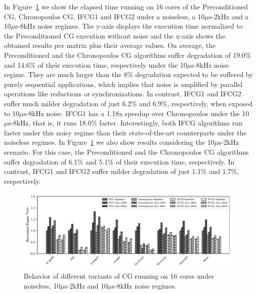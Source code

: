 In Figure~\ref{resiliency} we show the elapsed time running on 16 cores of the Preconditioned CG, Chronopoulos CG, IFCG1 and IFCG2 under a noiseless, a 10$\mu$s-2kHz and a 10$\mu$s-8kHz noise regimes. 
The y-axis displays the execution time normalized to the Preconditioned CG execution without noise and the x-axis shows the obtained results per matrix plus their average values. 
On average, the Preconditioned and the Chronopoulos CG algorithms suffer degradation of 19.0\% and 14.6\% of their execution time, respectively under the 10$\mu$s-8kHz noise regime. 
They are much larger than the 8\% degradation expected to be suffered by purely sequential applications, which implies that noise is amplified by parallel operations like reductions or synchronizations.
In contrast, IFCG1 and IFCG2 suffer much milder degradation of just 6.2\% and 6.9\%, respectively, when exposed to 10$\mu$s-8kHz noise.
IFCG1 has a 1.18x speedup over Chronopoulos under the 10$\mu$s-8kHz, that is, it runs 18.0\% faster.
Interestingly, both IFCG algorithms run faster under this noisy regime than their state-of-the-art counterparts under the noiseless regimes.
In Figure~\ref{resiliency} we also show results considering the 10$\mu$s-2kHz scenario.
For this case, the Preconditioned and the Chronopoulos CG algorithms suffer degradation of 6.1\% and 5.1\% of their execution time, respectively.
In contrast, IFCG1 and IFCG2 suffer milder degradation of just 1.1\% and 1.7\%, respectively.

\begin{figure}[!bhtp]
        \centerline{\includegraphics[width=\textwidth]{ifcg/figs/resiliency/resilient_unified.pdf}}
        \caption{Behavior of different variants of CG running on 16 cores under noiseless, 10$\mu$s-2kHz and 10$\mu$s-8kHz noise regimes.}
        \label{resiliency}
\end{figure}


